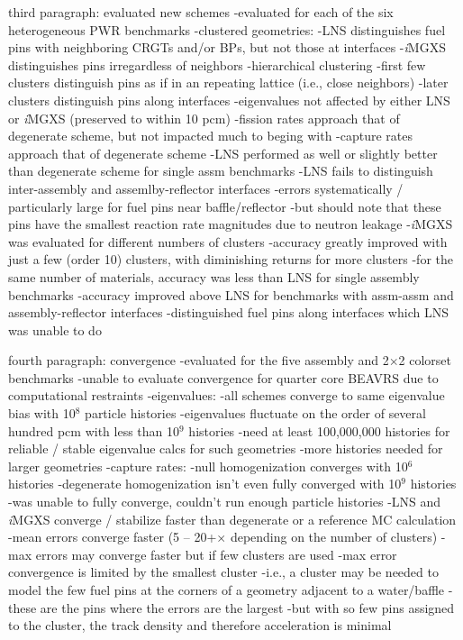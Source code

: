 third paragraph: evaluated new schemes  
-evaluated for each of the six heterogeneous \ac{PWR} benchmarks
-clustered geometries:
  -LNS distinguishes fuel pins with neighboring \acp{CRGT} and/or \acp{BP}, but not those at interfaces
  -\textit{i}\ac{MGXS} distinguishes pins irregardless of neighbors
    -hierarchical clustering
    -first few clusters distinguish pins as if in an repeating lattice (i.e., close neighbors)
    -later clusters distinguish pins along interfaces    
-eigenvalues not affected by either \ac{LNS} or \textit{i}\ac{MGXS} (preserved to within 10 \ac{pcm})
-fission rates approach that of degenerate scheme, but not impacted much to beging with
-capture rates approach that of degenerate scheme
  -\ac{LNS} performed as well or slightly better than degenerate scheme for single assm benchmarks
  -\ac{LNS} fails to distinguish inter-assembly and assemlby-reflector interfaces
    -errors systematically / particularly large for fuel pins near baffle/reflector
    -but should note that these pins have the smallest reaction rate magnitudes due to neutron leakage
  -\textit{i}\ac{MGXS} was evaluated for different numbers of clusters
    -accuracy greatly improved with just a few (order 10) clusters, with diminishing returns for more clusters
    -for the same number of materials, accuracy was less than \ac{LNS} for single assembly benchmarks
    -accuracy improved above \ac{LNS} for benchmarks with assm-assm and assembly-reflector interfaces
      -distinguished fuel pins along interfaces which \ac{LNS} was unable to do
      
fourth paragraph: convergence
-evaluated for the five assembly and 2$\times$2 colorset benchmarks
-unable to evaluate convergence for quarter core \ac{BEAVRS} due to computational restraints
-eigenvalues:
  -all schemes converge to same eigenvalue bias with 10$^8$ particle histories
  -eigenvalues fluctuate on the order of several hundred \ac{pcm} with less than 10$^{9}$ histories
    -need at least 100,000,000 histories for reliable / stable eigenvalue calcs for such geometries
      -more histories needed for larger geometries
-capture rates:
  -null homogenization converges with 10$^6$ histories
  -degenerate homogenization isn't even fully converged with 10$^9$ histories
    -was unable to fully converge, couldn't run enough particle histories
  -\ac{LNS} and \textit{i}\ac{MGXS} converge / stabilize faster than degenerate or a reference \ac{MC} calculation
    -mean errors converge faster (5 -- 20+$\times$ depending on the number of clusters)
    -max errors may converge faster but if few clusters are used
      -max error convergence is limited by the smallest cluster
      -i.e., a cluster may be needed to model the few fuel pins at the corners of a geometry adjacent to a water/baffle
        -these are the pins where the errors are the largest
        -but with so few pins assigned to the cluster, the track density and therefore acceleration is minimal

